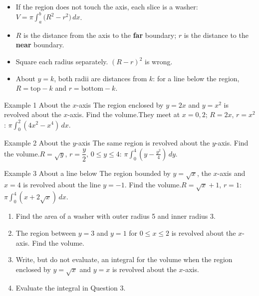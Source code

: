 \documentclass[11pt]{article}
\begin{document}

\begin{ideabox}
\begin{itemize}[leftmargin=*,itemsep=2pt,topsep=2pt]
  \item If the region does not touch the axis, each slice is a washer: $V=\pi\displaystyle\int_{a}^{b}\big(R^2-r^2\big)\,dx$.
  \item $R$ is the distance from the axis to the \textbf{far} boundary; $r$ is the distance to the \textbf{near} boundary.
  \item Square each radius separately. $(R-r)^2$ is wrong.
  \item About $y=k$, both radii are distances from $k$: for a line below the region, $R=\text{top}-k$ and $r=\text{bottom}-k$.
\end{itemize}
\end{ideabox}

\begin{example}{Example 1 \textperiodcentered{} About the $x$-axis}
The region enclosed by $y=2x$ and $y=x^2$ is revolved about the $x$-axis. Find the volume.\soln They meet at $x=0,2$; $R=2x$, $r=x^2$: $\pi\displaystyle\int_{0}^{2}(4x^2-x^4)\,dx$.
\end{example}

\begin{example}{Example 2 \textperiodcentered{} About the $y$-axis}
The same region is revolved about the $y$-axis. Find the volume.\soln $R=\sqrt y$, $r=\dfrac y2$, $0\le y\le4$: $\pi\displaystyle\int_{0}^{4}\left(y-\tfrac{y^2}{4}\right)\,dy$.
\end{example}

\begin{example}{Example 3 \textperiodcentered{} About a line below}
The region bounded by $y=\sqrt{x}$, the $x$-axis and $x=4$ is revolved about the line $y=-1$. Find the volume.\soln $R=\sqrt x+1$, $r=1$: $\pi\displaystyle\int_{0}^{4}(x+2\sqrt x)\,dx$.
\end{example}

\newpage
{}

\begin{enumerate}[leftmargin=*,itemsep=2pt]
  \item Find the area of a washer with outer radius 5 and inner radius 3.\work{2.3cm}
  \item The region between $y=3$ and $y=1$ for $0\le x\le2$ is revolved about the $x$-axis. Find the volume.\work{2.3cm}
  \item Write, but do not evaluate, an integral for the volume when the region enclosed by $y=\sqrt{x}$ and $y=x$ is revolved about the $x$-axis.\work{2.3cm}
  \item Evaluate the integral in Question 3.\work{2.3cm}
\end{enumerate}
\end{document}
